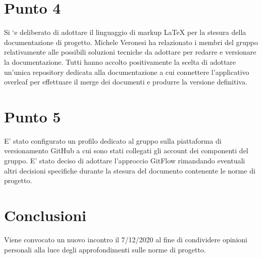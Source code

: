 \documentclass[12pt,italian,a4paper]{article}
\begin{document}
	\section*{Punto 4}

    Si `e deliberato di adottare il linguaggio di markup LaTeX per la stesura della documentazione di progetto. Michele Veronesi ha relazionato i membri del gruppo relativamente alle possibili soluzioni tecniche da adottare per redarre e versionare la documentazione. Tutti hanno accolto positivamente la scelta di adottare un’unica repository dedicata alla documentazione a cui connettere l’applicativo overleaf per effettuare il merge dei documenti e produrre la versione definitiva.

	\section*{Punto 5}
    E’ stato configurato un profilo dedicato al gruppo sulla piattaforma di versionamento GitHub a cui sono stati collegati gli account dei componenti del gruppo. E’ stato deciso di adottare l’approccio GitFlow rimandando eventuali altri decisioni specifiche durante la stesura del documento contenente le norme di progetto.


	\section*{Conclusioni}
	Viene convocato un nuovo incontro il 7/12/2020 al fine di condividere opinioni personali alla luce degli approfondimenti sulle norme di progetto.
\end{document}
